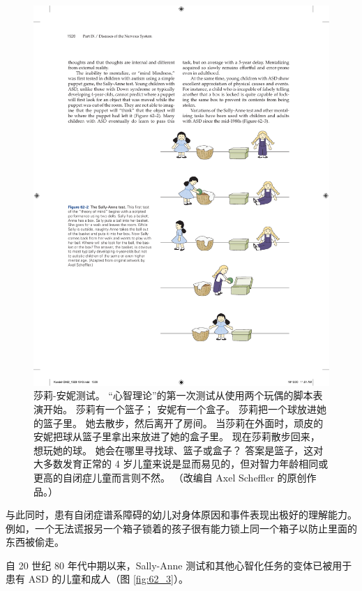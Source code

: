 \begin{figure}[htbp]
	\centering
	\includegraphics[width=0.65\linewidth]{chap62/fig_62_2}
	\caption{莎莉-安妮测试。 “心智理论”的第一次测试从使用两个玩偶的脚本表演开始。 莎莉有一个篮子； 安妮有一个盒子。 莎莉把一个球放进她的篮子里。 她去散步，然后离开了房间。 当莎莉在外面时，顽皮的安妮把球从篮子里拿出来放进了她的盒子里。 现在莎莉散步回来，想玩她的球。 她会在哪里寻找球、篮子或盒子？ 答案是篮子，这对大多数发育正常的 4 岁儿童来说是显而易见的，但对智力年龄相同或更高的自闭症儿童而言则不然。 （改编自 Axel Scheffler 的原创作品。）}
	\label{fig:62_2}
\end{figure}


与此同时，患有自闭症谱系障碍的幼儿对身体原因和事件表现出极好的理解能力。
例如，一个无法谎报另一个箱子锁着的孩子很有能力锁上同一个箱子以防止里面的东西被偷走。


自 20 世纪 80 年代中期以来，Sally-Anne 测试和其他心智化任务的变体已被用于患有 ASD 的儿童和成人（图 \ref{fig:62_3}）。


